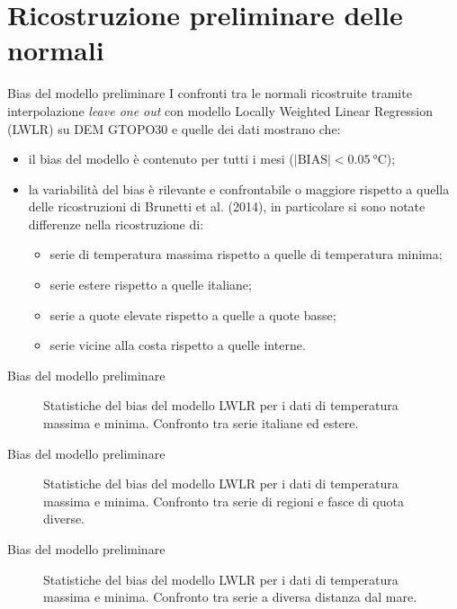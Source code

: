 
\section{Ricostruzione preliminare delle normali}
\begin{frame}[t]{Bias del modello preliminare}
  I confronti tra le normali ricostruite tramite interpolazione \emph{leave one out} con modello Locally Weighted Linear Regression (LWLR) su DEM GTOPO30 e quelle dei dati mostrano che:
  \begin{itemize}
    \item il bias del modello è contenuto per tutti i mesi (\(\lvert \mathrm{BIAS} \rvert < \qty{0.05}{\degreeCelsius}\));
    \item la variabilità del bias è rilevante e confrontabile o maggiore rispetto a quella delle ricostruzioni di Brunetti et al. (2014), in particolare si sono notate differenze nella ricostruzione di:
      \begin{itemize}
        \item serie di temperatura massima rispetto a quelle di temperatura minima;
        \item serie estere rispetto a quelle italiane;
        \item serie a quote elevate rispetto a quelle a quote basse;
        \item serie vicine alla costa rispetto a quelle interne.
      \end{itemize}
  \end{itemize}
\end{frame}

\begin{frame}[t]{Bias del modello preliminare}
  \begin{figure}
    
    \caption*{Statistiche del bias del modello LWLR per i dati di temperatura massima e minima. Confronto tra serie italiane ed estere.}
  \end{figure}
\end{frame}

\begin{frame}[t]{Bias del modello preliminare}
  \begin{figure}
    
    \caption*{Statistiche del bias del modello LWLR per i dati di temperatura massima e minima. Confronto tra serie di regioni e fasce di quota diverse.}
  \end{figure}
\end{frame}

\begin{frame}[t]{Bias del modello preliminare}
  \begin{figure}
    
    \caption*{Statistiche del bias del modello LWLR per i dati di temperatura massima e minima. Confronto tra serie a diversa distanza dal mare.}
  \end{figure}
\end{frame}